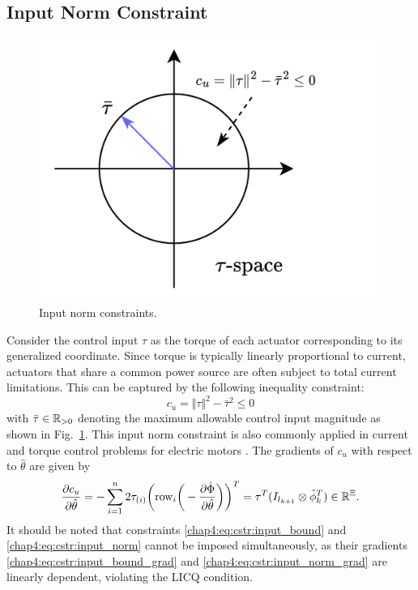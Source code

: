 \subsection{Input Norm Constraint} \label{chap4:sec:input_norm_cstr}

\begin{figure}[t]
    \centering
    \includegraphics[width=0.5\linewidth]{imgs/cstr_input_norm.drawio.png}
    \caption{Input norm constraints.}
    \label{chap4:fig:cstr:u_norm}
\end{figure}

Consider the control input $\tau$ as the torque of each actuator corresponding to its generalized coordinate. Since torque is typically linearly proportional to current, actuators that share a common power source are often subject to total current limitations. This can be captured by the following inequality constraint: 
\begin{equation}
    c_{u}=\Vert\tau\Vert^2 -\bar\tau^2  \le 0
    \label{chap4:eq:cstr:input_norm}
\end{equation}
with $\bar\tau\in\mathbb{R}_{>0}$ denoting the maximum allowable control input magnitude as shown in Fig.~\ref{chap4:fig:cstr:u_norm}. 
This input norm constraint is also commonly applied in current and torque control problems for electric motors \cite{RN90}.
The gradients of $c_{u}$ with respect to $\hat\theta$ are given by
\begin{equation}
    {\partial \mathbf \mathbf c_{u} \over \partial \hat\theta}
    = -\sum_{i=1}^n 2\tau_{(i)} 
    \bigg(
        \text{row}_i
        \bigg(
            -{\partial \hat\Phi\over\partial\hat\theta}
        \bigg)
    \bigg)^T  
    = \tau^T (I_{l_{k+1}}\otimes \hat\phi_k^T)
    \in \mathbb{R}^{\Xi}.
    \label{chap4:eq:cstr:input_norm_grad}
\end{equation}
It should be noted that constraints \eqref{chap4:eq:cstr:input_bound} and \eqref{chap4:eq:cstr:input_norm} cannot be imposed simultaneously, as their gradients \eqref{chap4:eq:cstr:input_bound_grad} and \eqref{chap4:eq:cstr:input_norm_grad} are linearly dependent, violating the LICQ condition.

